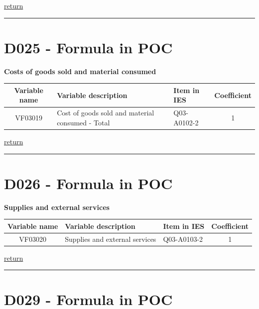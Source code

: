 \documentclass[]{book}
\begin{document}
\protect\hyperlink{b3.-profit-and-loss-statement-variables}{return}

\begin{center}\rule{0.5\linewidth}{\linethickness}\end{center}

\hypertarget{d025---formula-in-poc}{%
\section{D025 - Formula in POC}\label{d025---formula-in-poc}}

\textbf{Costs of goods sold and material consumed}

\begin{longtable}[]{@{}cllc@{}}
\toprule
Variable name & Variable description & Item in IES & Coefficient\tabularnewline
\midrule
\endhead
VF03019 & Cost of goods sold and material consumed - Total & Q03-A0102-2 & 1\tabularnewline
\bottomrule
\end{longtable}

\protect\hyperlink{b3.-profit-and-loss-statement-variables}{return}

\begin{center}\rule{0.5\linewidth}{\linethickness}\end{center}

\hypertarget{d026---formula-in-poc}{%
\section{D026 - Formula in POC}\label{d026---formula-in-poc}}

\textbf{Supplies and external services}

\begin{longtable}[]{@{}cllc@{}}
\toprule
Variable name & Variable description & Item in IES & Coefficient\tabularnewline
\midrule
\endhead
VF03020 & Supplies and external services & Q03-A0103-2 & 1\tabularnewline
\bottomrule
\end{longtable}

\protect\hyperlink{b3.-profit-and-loss-statement-variables}{return}

\begin{center}\rule{0.5\linewidth}{\linethickness}\end{center}

\hypertarget{d029---formula-in-poc}{%
\section{D029 - Formula in POC}\label{d029---formula-in-poc}}
\end{document}
